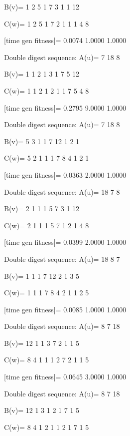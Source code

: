 B(v)=
     1     2     5     1     7     3     1     1    12

C(w)=
     1     2     5     1     7     2     1     1     1     4     8

[time gen fitness]=
    0.0074    1.0000    1.0000

Double digest sequence:
A(u)=
     7    18     8

B(v)=
     1     1     2     1     3     1     7     5    12

C(w)=
     1     1     2     1     2     1     1     7     5     4     8

[time gen fitness]=
    0.2795    9.0000    1.0000

Double digest sequence:
A(u)=
     7    18     8

B(v)=
     5     3     1     1     7    12     1     2     1

C(w)=
     5     2     1     1     1     7     8     4     1     2     1

[time gen fitness]=
    0.0363    2.0000    1.0000

Double digest sequence:
A(u)=
    18     7     8

B(v)=
     2     1     1     1     5     7     3     1    12

C(w)=
     2     1     1     1     5     7     1     2     1     4     8

[time gen fitness]=
    0.0399    2.0000    1.0000

Double digest sequence:
A(u)=
    18     8     7

B(v)=
     1     1     1     7    12     2     1     3     5

C(w)=
     1     1     1     7     8     4     2     1     1     2     5

[time gen fitness]=
    0.0085    1.0000    1.0000

Double digest sequence:
A(u)=
     8     7    18

B(v)=
    12     1     1     3     7     2     1     1     5

C(w)=
     8     4     1     1     1     2     7     2     1     1     5

[time gen fitness]=
    0.0645    3.0000    1.0000

Double digest sequence:
A(u)=
     8     7    18

B(v)=
    12     1     3     1     2     1     7     1     5

C(w)=
     8     4     1     2     1     1     2     1     7     1     5

